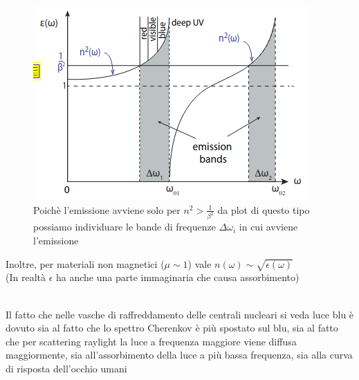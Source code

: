 \hspace{-15pt}
\begin{minipage}{0.48\textwidth}
    \begin{figure}[H]
        \centering
        \includegraphics[width=\textwidth,frame]{Chapters/images/Particle_identification/image-20220317143923078.png}
        \captionsetup{width=\textwidth}
        \caption{Poichè l'emissione avviene solo per $n^2>\frac{1}{\beta^2}$ da plot di questo tipo possiamo individuare le bande di frequenze $\Delta \omega_i$ in cui avviene l'emissione}
    \end{figure}
\end{minipage} \hspace{5pt}
\begin{minipage}{0.48\textwidth}

    Inoltre, per materiali non magnetici ($\mu \sim 1$) vale $n(\omega)\sim\sqrt{\epsilon(\omega)}$\\ 
(In realtà $\epsilon$ ha anche una parte immaginaria che causa assorbimento)
\begin{details}\hfill \\
    Il fatto che nelle vasche di raffreddamento delle centrali nucleari si veda luce blu è dovuto sia al fatto che lo spettro Cherenkov è più spostato sul blu, sia al fatto che per scattering raylight la luce a frequenza maggiore viene diffusa maggiormente, sia all'assorbimento della luce a più bassa frequenza, sia alla curva di risposta dell'occhio umani

\end{details}
    

\end{minipage}

